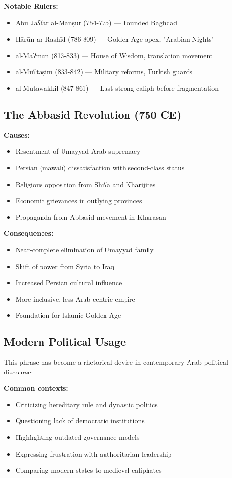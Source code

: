\documentclass[letterpaper,12pt]{article}
\begin{document}
\begin{tcolorbox}[colback=boxcolor,colframe=accentcolor,title=\textbf{Detailed Historical Background},breakable]
\textbf{Notable Rulers:}
\begin{itemize}
\item Abū Jaʕfar al-Manṣūr (754-775) — Founded Baghdad
\item Hārūn ar-Rashīd (786-809) — Golden Age apex, "Arabian Nights"
\item al-Maʔmūn (813-833) — House of Wisdom, translation movement
\item al-Muʕtaṣim (833-842) — Military reforms, Turkish guards
\item al-Mutawakkil (847-861) — Last strong caliph before fragmentation
\end{itemize}

\subsection*{The Abbasid Revolution (750 CE)}

\textbf{Causes:}
\begin{itemize}
\item Resentment of Umayyad Arab supremacy
\item Persian (mawālī) dissatisfaction with second-class status
\item Religious opposition from Shīʕa and Khārijites
\item Economic grievances in outlying provinces
\item Propaganda from Abbasid movement in Khurasan
\end{itemize}

\textbf{Consequences:}
\begin{itemize}
\item Near-complete elimination of Umayyad family
\item Shift of power from Syria to Iraq
\item Increased Persian cultural influence
\item More inclusive, less Arab-centric empire
\item Foundation for Islamic Golden Age
\end{itemize}

\subsection*{Modern Political Usage}

This phrase has become a rhetorical device in contemporary Arab political discourse:

\textbf{Common contexts:}
\begin{itemize}
\item Criticizing hereditary rule and dynastic politics
\item Questioning lack of democratic institutions
\item Highlighting outdated governance models
\item Expressing frustration with authoritarian leadership
\item Comparing modern states to medieval caliphates
\end{itemize}


\end{tcolorbox}
\end{document}
